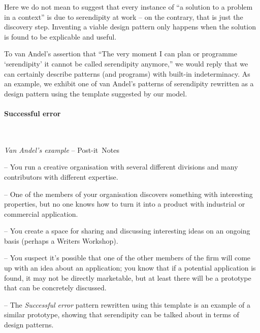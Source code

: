 Here we do not mean to suggest that every instance of ``a solution to a
problem in a context'' is due to serendipity at work -- on the
contrary, that is just the discovery step.  Inventing a viable design pattern
only happens when the solution is found to be explicable and useful.

To van Andel's assertion that ``The very moment I can plan or
programme `serendipity' it cannot be called serendipity anymore,'' we
would reply that we can certainly describe patterns (and programs)
with built-in indeterminacy.  As an example, we exhibit one of van
Andel's patterns of serendipity rewritten as a design pattern using
the template suggested by our model.

\begin{mdframed}
\vspace{-.35cm}
\paragraph{\textbf{Successful error}}~
\baselineskip
\begin{flushright}\emph{Van Andel's example} -- Post-it\texttrademark\ Notes
\end{flushright}
\vspace{-.15cm}
\begin{description}[itemsep=2pt]
\item[{\tt context}] -- You run a creative organisation with several different divisions and many contributors with different expertise.  
\item[{\tt problem}] -- One of the members of your organisation
  discovers something with interesting properties, but no one
  knows how to turn it into a product with industrial or commercial application.
\item[{\tt solution}] -- You create a space for sharing and discussing
  interesting ideas on an ongoing basis (perhaps a Writers Workshop).
\item[{\tt rationale}] -- You suspect it's possible that one of the
  other members of the firm will come up with an idea about an
  application; you know that if a potential application is found, it
  may not be directly marketable, but at least there will be a
  prototype that can be concretely discussed.
\item[{\tt resolution}] -- The \emph{Successful error} pattern
  rewritten using this template is an example of a similar
  prototype, showing that serendipity can be talked about in
  terms of design patterns.
\end{description}
\end{mdframed}

